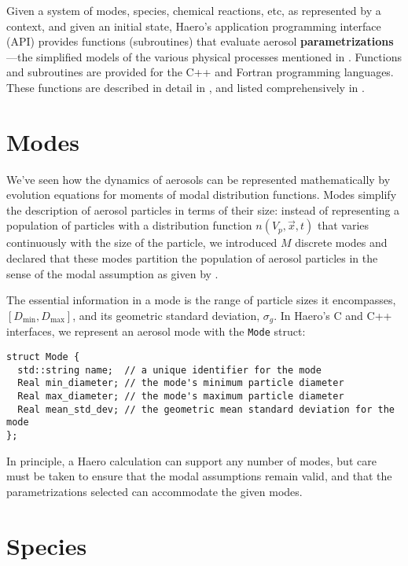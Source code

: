 Given a system of modes, species, chemical reactions, etc, as represented by a
context, and given an initial state, Haero's application programming interface
(API) provides functions (subroutines) that evaluate aerosol
{\bf parametrizations}---the simplified models of the various physical processes
mentioned in . Functions and subroutines are provided for
the C++ and Fortran programming languages. These functions are described in
detail in , and listed comprehensively in
.

\section{Modes}

We've seen how the dynamics of aerosols can be represented mathematically
by evolution equations for moments of modal distribution functions. Modes
simplify the description of aerosol particles in terms of their size: instead of
representing a population of particles with a distribution function
$n(V_p, \vec{x}, t)$ that varies continuously with the size of the particle, we
introduced $M$ discrete modes and declared that these modes partition the
population of aerosol particles in the sense of the modal assumption as given
by .

The essential information in a mode is the range of particle sizes it
encompasses, $[D_{\min}, D_{\max}]$, and its geometric standard deviation,
$\sigma_g$. In Haero's C and C++ interfaces,
we represent an aerosol mode with the \verb|Mode| struct:

\begin{verbatim}
struct Mode {
  std::string name;  // a unique identifier for the mode
  Real min_diameter; // the mode's minimum particle diameter
  Real max_diameter; // the mode's maximum particle diameter
  Real mean_std_dev; // the geometric mean standard deviation for the mode
};
\end{verbatim}

In principle, a Haero calculation can support any number of modes, but care
must be taken to ensure that the modal assumptions remain valid, and that
the parametrizations selected can accommodate the given modes.

\section{Species}

